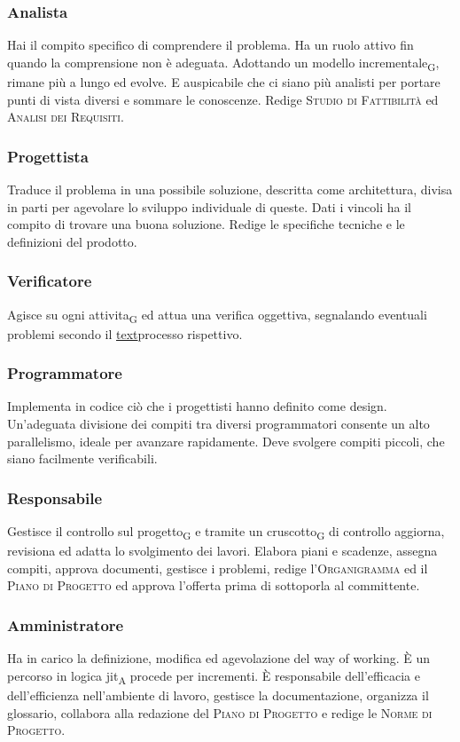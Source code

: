     \subsubsection{Analista}
    Hai il compito specifico di comprendere il problema. Ha un ruolo attivo fin quando la comprensione non è adeguata. Adottando un modello incrementale\textsubscript{G}, rimane più a lungo ed evolve. E auspicabile che ci siano più analisti per portare punti di vista diversi e sommare le conoscenze. Redige \textsc{Studio di Fattibilità} ed \textsc{Analisi dei Requisiti}.
    \subsubsection{Progettista}
    Traduce il problema in una possibile soluzione, descritta come architettura, divisa in parti per agevolare lo sviluppo individuale di queste. Dati i vincoli ha il compito di trovare una buona soluzione. Redige le specifiche tecniche e le definizioni del prodotto.
    \subsubsection{Verificatore}
    Agisce su ogni attivita\textsubscript{G} ed attua una verifica oggettiva, segnalando eventuali problemi secondo il \hyperref[label]{text}{processo rispettivo}.
    \subsubsection{Programmatore}
    Implementa in codice ciò che i progettisti hanno definito come design. Un'adeguata divisione dei compiti tra diversi programmatori consente un alto parallelismo, ideale per avanzare rapidamente. Deve svolgere compiti piccoli, che siano facilmente verificabili.
    \subsubsection{Responsabile}
    Gestisce il controllo sul progetto\textsubscript{G} e tramite un cruscotto\textsubscript{G} di controllo aggiorna, revisiona ed adatta lo svolgimento dei lavori. Elabora piani e scadenze, assegna compiti, approva documenti, gestisce i problemi, redige l'\textsc{Organigramma} ed il \textsc{Piano di Progetto} ed approva l'offerta prima di sottoporla al committente.
    \subsubsection{Amministratore}
    Ha in carico la definizione, modifica ed agevolazione del way of working. È un percorso in logica jit\textsubscript{A} procede per incrementi. È responsabile dell'efficacia e dell'efficienza nell'ambiente di lavoro, gestisce la documentazione, organizza il glossario, collabora alla redazione del \textsc{Piano di Progetto} e redige le \textsc{Norme di Progetto}.


